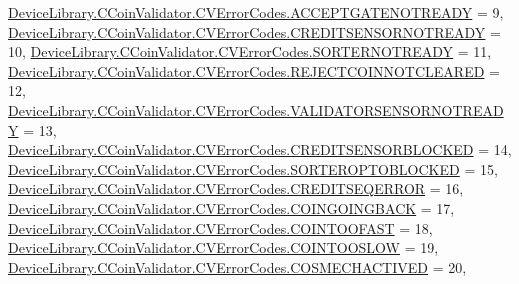 \begin{DoxyCompactItemize}
\mbox{\hyperlink{group___erreur_gga68c5b73cc3b337502d9f92154d933591a488417ec04b13c6dcf02bdecb8597051}{Device\+Library.\+C\+Coin\+Validator.\+C\+V\+Error\+Codes.\+A\+C\+C\+E\+P\+T\+G\+A\+T\+E\+N\+O\+T\+R\+E\+A\+DY}} = 9, 
\mbox{\hyperlink{group___erreur_gga68c5b73cc3b337502d9f92154d933591aa5c66915ba05071d42f5262814f1f154}{Device\+Library.\+C\+Coin\+Validator.\+C\+V\+Error\+Codes.\+C\+R\+E\+D\+I\+T\+S\+E\+N\+S\+O\+R\+N\+O\+T\+R\+E\+A\+DY}} = 10, 
\mbox{\hyperlink{group___erreur_gga68c5b73cc3b337502d9f92154d933591aeb24605f73e423b795d431b13e81789d}{Device\+Library.\+C\+Coin\+Validator.\+C\+V\+Error\+Codes.\+S\+O\+R\+T\+E\+R\+N\+O\+T\+R\+E\+A\+DY}} = 11, 
\newline
\mbox{\hyperlink{group___erreur_gga68c5b73cc3b337502d9f92154d933591a5f05f23aa23d4394442a22d01092b185}{Device\+Library.\+C\+Coin\+Validator.\+C\+V\+Error\+Codes.\+R\+E\+J\+E\+C\+T\+C\+O\+I\+N\+N\+O\+T\+C\+L\+E\+A\+R\+ED}} = 12, 
\mbox{\hyperlink{group___erreur_gga68c5b73cc3b337502d9f92154d933591a529f5ada9f1b5031cdb17562a57bf07c}{Device\+Library.\+C\+Coin\+Validator.\+C\+V\+Error\+Codes.\+V\+A\+L\+I\+D\+A\+T\+O\+R\+S\+E\+N\+S\+O\+R\+N\+O\+T\+R\+E\+A\+DY}} = 13, 
\mbox{\hyperlink{group___erreur_gga68c5b73cc3b337502d9f92154d933591ad9dfefcc80c822a24a0ad3380eb36cf2}{Device\+Library.\+C\+Coin\+Validator.\+C\+V\+Error\+Codes.\+C\+R\+E\+D\+I\+T\+S\+E\+N\+S\+O\+R\+B\+L\+O\+C\+K\+ED}} = 14, 
\mbox{\hyperlink{group___erreur_gga68c5b73cc3b337502d9f92154d933591ad5ffb15a2080554273173e94ab156096}{Device\+Library.\+C\+Coin\+Validator.\+C\+V\+Error\+Codes.\+S\+O\+R\+T\+E\+R\+O\+P\+T\+O\+B\+L\+O\+C\+K\+ED}} = 15, 
\newline
\mbox{\hyperlink{group___erreur_gga68c5b73cc3b337502d9f92154d933591afd097e798482607f42e03a4fe28a4040}{Device\+Library.\+C\+Coin\+Validator.\+C\+V\+Error\+Codes.\+C\+R\+E\+D\+I\+T\+S\+E\+Q\+E\+R\+R\+OR}} = 16, 
\mbox{\hyperlink{group___erreur_gga68c5b73cc3b337502d9f92154d933591ad092fef941ebaf843780f10dc910af1c}{Device\+Library.\+C\+Coin\+Validator.\+C\+V\+Error\+Codes.\+C\+O\+I\+N\+G\+O\+I\+N\+G\+B\+A\+CK}} = 17, 
\mbox{\hyperlink{group___erreur_gga68c5b73cc3b337502d9f92154d933591a561dba7292ec10b3dd57fc75609c82d8}{Device\+Library.\+C\+Coin\+Validator.\+C\+V\+Error\+Codes.\+C\+O\+I\+N\+T\+O\+O\+F\+A\+ST}} = 18, 
\mbox{\hyperlink{group___erreur_gga68c5b73cc3b337502d9f92154d933591a44c9d0c8f952ac7cd9976e8d9cb0b5ac}{Device\+Library.\+C\+Coin\+Validator.\+C\+V\+Error\+Codes.\+C\+O\+I\+N\+T\+O\+O\+S\+L\+OW}} = 19, 
\newline
\mbox{\hyperlink{group___erreur_gga68c5b73cc3b337502d9f92154d933591a8fe88ac7acc89aaabdb1bd870fd7ceb2}{Device\+Library.\+C\+Coin\+Validator.\+C\+V\+Error\+Codes.\+C\+O\+S\+M\+E\+C\+H\+A\+C\+T\+I\+V\+ED}} = 20, 

\end{DoxyCompactItemize}
